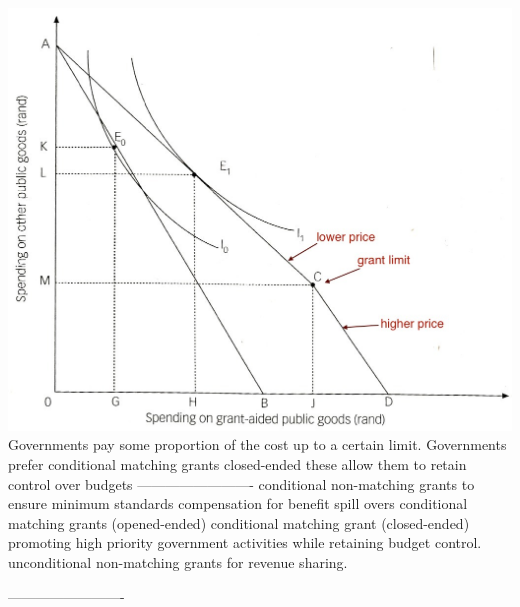 \documentclass[12pt]{examnotes}
\begin{document}
\includegraphics[scale=0.3]{./imgs/174.jpg}
\ra Governments pay some proportion of the cost up to a certain limit.
\ra Governments prefer conditional matching grants closed-ended these allow them to retain control over budgets
-------------------------
\ra conditional non-matching grants to ensure minimum standards
\ra compensation for benefit spill overs conditional matching grants (opened-ended)
\ra conditional matching grant (closed-ended) promoting high priority government activities while retaining budget control.
\ra unconditional non-matching grants for revenue sharing.

-------------------------
\ra {}
\end{document}
